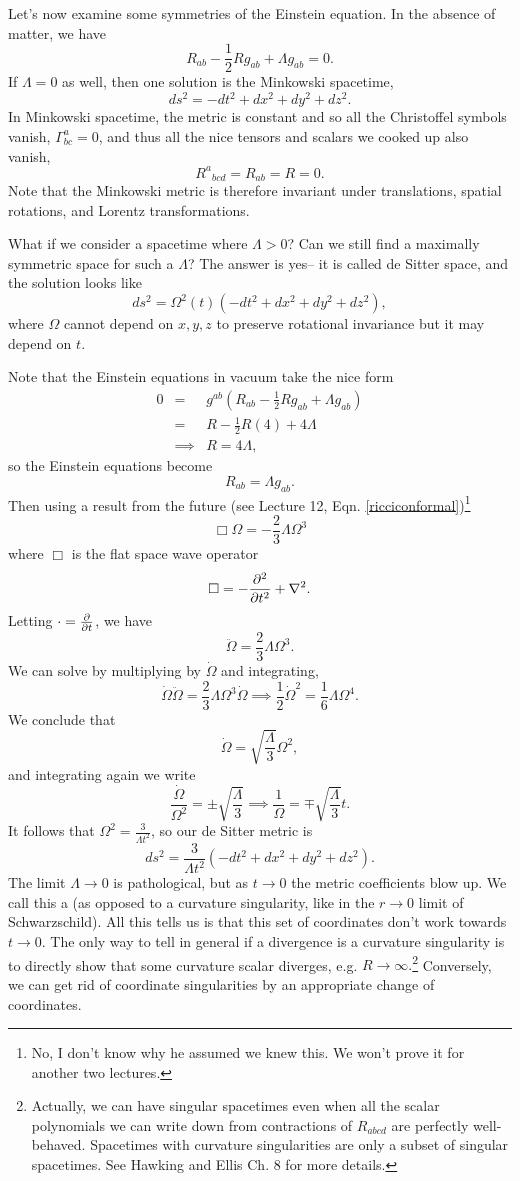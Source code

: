Let's now examine some symmetries of the Einstein equation. In the absence of matter, we have
$$R_{ab}-\frac{1}{2} R g_{ab} +\Lambda g_{ab}=0.$$
If $\Lambda=0$ as well, then one solution is the Minkowski spacetime,
$$ds^2 = -dt^2 + dx^2 +dy^2 +dz^2.$$
In Minkowski spacetime, the metric is constant and so all the Christoffel symbols vanish, $\Gamma^a_{bc}=0$, and thus all the nice tensors and scalars we cooked up also vanish,
$${R^a}_{bcd}=R_{ab}=R=0.$$ Note that the Minkowski metric is therefore invariant under translations, spatial rotations, and Lorentz transformations.

What if we consider a spacetime where $\Lambda >0$? Can we still find a maximally symmetric space for such a $\Lambda$? The answer is yes-- it is called de Sitter space, and the solution looks like
$$ds^2=\Omega^2(t) (-dt^2+dx^2+dy^2+dz^2),$$
where $\Omega$ cannot depend on $x,y,z$ to preserve rotational invariance but it may depend on $t$.

Note that the Einstein equations in vacuum take the nice form
\begin{eqnarray*}
0&=& g^{ab}(R_{ab}-\frac{1}{2} R g_{ab}+\Lambda g_{ab})\\
&=&R -\frac{1}{2} R (4) +4 \Lambda\\
&\implies& R=4\Lambda,
\end{eqnarray*}
so the Einstein equations become
$$R_{ab}=\Lambda g_{ab}.$$
Then using a result from the future (see Lecture 12, Eqn. \ref{ricciconformal})\footnote{No, I don't know why he assumed we knew this. We won't prove it for another two lectures.}
$$\Box \Omega = -\frac{2}{3} \Lambda \Omega^3$$
where $\Box$ is the flat space wave operator
$$\Box = -\frac{\p^2}{\p t^2}+\nabla^2.$$
Letting $\cdot =\P{}{t}$, we have
$$\ddot \Omega = \frac{2}{3} \Lambda \Omega^3.$$
We can solve by multiplying by $\dot \Omega$ and integrating,
$$\dot \Omega \ddot \Omega = \frac{2}{3} \Lambda \Omega^3 \dot \Omega \implies \frac{1}{2} \dot \Omega^2 = \frac{1}{6} \Lambda \Omega^4.$$
We conclude that
$$\dot \Omega = \sqrt{\frac{\Lambda}{3}} \Omega^2,$$
and integrating again we write
$$\frac{\dot \Omega}{\Omega^2}=\pm\sqrt{\frac{\Lambda}{3}} \implies \frac{1}{\Omega}=\mp \sqrt{\frac{\Lambda}{3}}t.$$
It follows that $\Omega^2=\frac{3}{\Lambda t^2}$, so our de Sitter metric is
$$ds^2 = \frac{3}{\Lambda t^2}(-dt^2+dx^2 +dy^2 +dz^2).$$
The limit $\Lambda \to 0$ is pathological, but as $t\to 0$ the metric coefficients blow up. We call this a  (as opposed to a curvature singularity, like in the $r\to 0$ limit of Schwarzschild). All this tells us is that this set of coordinates don't work towards $t\to 0$. The only way to tell in general if a divergence is a curvature singularity is to directly show that some curvature scalar diverges, e.g. $R\to \infty.$\footnote{Actually, we can have singular spacetimes even when all the scalar polynomials we can write down from contractions of $R_{abcd}$ are perfectly well-behaved. Spacetimes with curvature singularities are only a subset of singular spacetimes. See Hawking and Ellis Ch. 8 for more details.} Conversely, we can get rid of coordinate singularities by an appropriate change of coordinates.

